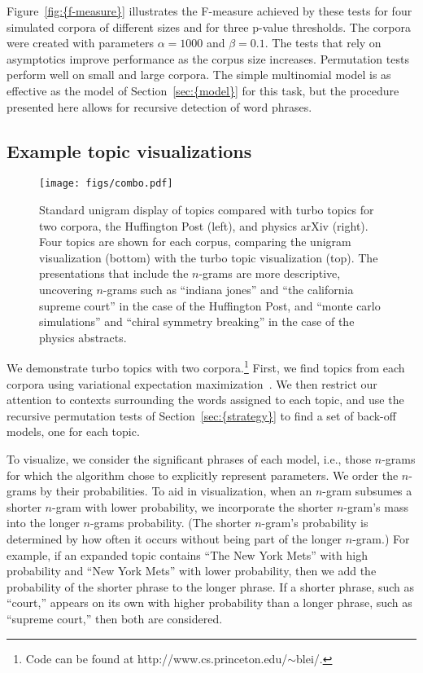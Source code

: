 \documentclass[11pt]{article}
\begin{document}
{Figure~\ref{fig:{f-measure}}} illustrates the F-measure achieved by these tests
for four simulated corpora of different sizes and for three p-value
thresholds.  The corpora were created with parameters $\alpha=1000$
and $\beta=0.1$.  The tests that rely on asymptotics improve
performance as the corpus size increases.  Permutation tests perform
well on small and large corpora.  The simple multinomial model is as
effective as the model of {Section~\ref{sec:{model}}} for this task, but the
procedure presented here allows for recursive detection of word
phrases.

\subsection{Example topic visualizations}
\label{sec:topics}

\begin{figure*}[t]
\begin{center}
\texttt{[image: figs/combo.pdf]}
\caption{\label{fig:huff} Standard unigram display of topics compared
  with turbo topics for two corpora, the Huffington Post (left), and
  physics arXiv (right).  Four topics are shown for each corpus,
  comparing the unigram visualization (bottom) with the turbo topic
  visualization (top).  The presentations that include the $n$-grams
  are more descriptive, uncovering $n$-grams such as ``indiana jones''
  and ``the california supreme court'' in the case of the Huffington
  Post, and ``monte carlo simulations'' and ``chiral symmetry
  breaking'' in the case of the physics abstracts.}
\end{center}
\end{figure*}

We demonstrate turbo topics with two corpora.\footnote{Code can be
  found at http://www.cs.princeton.edu/$\sim$blei/.}  First, we find
topics from each corpora using variational expectation
maximization~\cite{Blei:2003b}.  We then restrict our attention to
contexts surrounding the words assigned to each topic, and use the
recursive permutation tests of {Section~\ref{sec:{strategy}}} to find a set of
back-off models, one for each topic.

To visualize, we consider the significant phrases of each model, i.e.,
those $n$-grams for which the algorithm chose to explicitly represent
parameters.  We order the $n$-grams by their probabilities.  To aid in
visualization, when an $n$-gram subsumes a shorter $n$-gram with lower
probability, we incorporate the shorter $n$-gram's mass into the
longer $n$-grams probability.  (The shorter $n$-gram's probability is
determined by how often it occurs without being part of the longer
$n$-gram.)  For example, if an expanded topic contains ``The New York
Mets'' with high probability and ``New York Mets'' with lower
probability, then we add the probability of the shorter phrase to the
longer phrase.  If a shorter phrase, such as ``court,'' appears on its
own with higher probability than a longer phrase, such as ``supreme
court,'' then both are considered.
\end{document}
